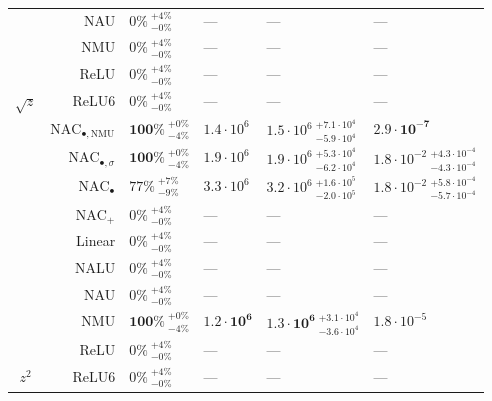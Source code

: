 \begin{longtable}{crllll}
 & NAU & $0\% {~}^{+4\%}_{-0\%}$ & --- & --- & ---\\

 & NMU & $0\% {~}^{+4\%}_{-0\%}$ & --- & --- & ---\\

 & ReLU & $0\% {~}^{+4\%}_{-0\%}$ & --- & --- & ---\\

\multirow{-10}{*}{\centering\arraybackslash $\sqrt{z}$} & ReLU6 & $0\% {~}^{+4\%}_{-0\%}$ & --- & --- & ---\\
\cmidrule{1-6}
 & $\mathrm{NAC}_{\bullet,\mathrm{NMU}}$ & $\mathbf{100\%} {~}^{+0\%}_{-4\%}$ & $1.4 \cdot 10^{6}$ & $1.5 \cdot 10^{6} {~}^{+7.1 \cdot 10^{4}}_{-5.9 \cdot 10^{4}}$ & $\mathbf{2.9 \cdot 10^{-7}}$\\

 & $\mathrm{NAC}_{\bullet,\sigma}$ & $\mathbf{100\%} {~}^{+0\%}_{-4\%}$ & $1.9 \cdot 10^{6}$ & $1.9 \cdot 10^{6} {~}^{+5.3 \cdot 10^{4}}_{-6.2 \cdot 10^{4}}$ & $1.8 \cdot 10^{-2} {~}^{+4.3 \cdot 10^{-4}}_{-4.3 \cdot 10^{-4}}$\\

 & $\mathrm{NAC}_{\bullet}$ & $77\% {~}^{+7\%}_{-9\%}$ & $3.3 \cdot 10^{6}$ & $3.2 \cdot 10^{6} {~}^{+1.6 \cdot 10^{5}}_{-2.0 \cdot 10^{5}}$ & $1.8 \cdot 10^{-2} {~}^{+5.8 \cdot 10^{-4}}_{-5.7 \cdot 10^{-4}}$\\

 & $\mathrm{NAC}_{+}$ & $0\% {~}^{+4\%}_{-0\%}$ & --- & --- & ---\\

 & Linear & $0\% {~}^{+4\%}_{-0\%}$ & --- & --- & ---\\

 & NALU & $0\% {~}^{+4\%}_{-0\%}$ & --- & --- & ---\\

 & NAU & $0\% {~}^{+4\%}_{-0\%}$ & --- & --- & ---\\

 & NMU & $\mathbf{100\%} {~}^{+0\%}_{-4\%}$ & $\mathbf{1.2 \cdot 10^{6}}$ & $\mathbf{1.3 \cdot 10^{6}} {~}^{+3.1 \cdot 10^{4}}_{-3.6 \cdot 10^{4}}$ & $1.8 \cdot 10^{-5}$\\

 & ReLU & $0\% {~}^{+4\%}_{-0\%}$ & --- & --- & ---\\

\multirow{-10}{*}{\centering\arraybackslash $z^2$} & ReLU6 & $0\% {~}^{+4\%}_{-0\%}$ & --- & --- & ---\\*
\end{longtable}
